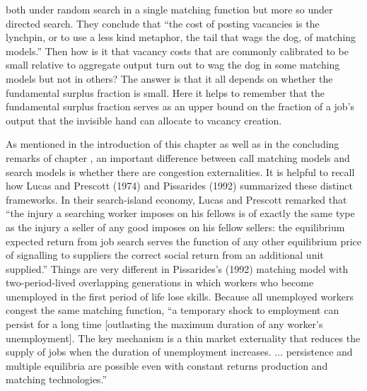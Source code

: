 both under random search in a single matching function but more so
under directed search.
They conclude that ``the cost of posting vacancies is the
lynchpin, or to use a less kind metaphor, the tail that wags the
dog, of matching models.'' Then how is it that vacancy costs that are
commonly calibrated to be small relative to aggregate output turn out to  wag
the dog in some matching models  but not in others? The answer is that it all
depends  on whether  the fundamental surplus
fraction is small.  Here it helps to remember that the fundamental surplus fraction serves as  an upper bound on the fraction of a job's output
that the invisible hand can allocate to vacancy creation.
%


As mentioned in the introduction of this chapter as well as
in the concluding remarks of chapter ,
an important difference between  call matching models and search models
is whether  there are congestion externalities.  It is helpful to recall how  Lucas
and Prescott (1974) and Pissarides (1992) summarized  these distinct frameworks.  In their search-island
economy, Lucas and Prescott remarked that ``the injury a
searching worker imposes on his fellows is of exactly the same
type as the injury a seller of any good imposes on his fellow
sellers: the equilibrium expected return from job search serves
the function of any other equilibrium price of signalling to
suppliers the correct social return from an additional unit
supplied.'' Things are very different in Pissarides's
(1992) matching model with two-period-lived overlapping
generations in which workers who become unemployed in the first period of life
lose skills. Because all unemployed workers congest the same
matching function, ``a temporary shock to employment can persist
for a long time [outlasting the maximum duration of any worker's
unemployment]. The key mechanism is a thin market externality
that reduces the supply of jobs when the duration of unemployment
increases. ... persistence and multiple equilibria are possible
even with constant returns production and matching technologies.''

